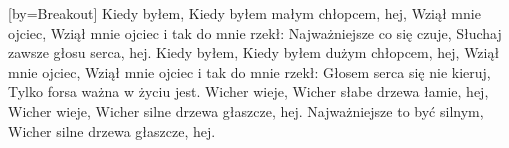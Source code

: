 [by={Breakout}]
  \beginverse
    Kiedy byłem,
    Kiedy byłem małym chłopcem, hej,
    Wziął mnie ojciec,
    Wziął mnie ojciec i tak do mnie rzekł:
    Najważniejsze co się czuje,
    Słuchaj zawsze głosu serca, hej.
  \endverse
  \beginverse
    Kiedy byłem,
    Kiedy byłem dużym chłopcem, hej,
    Wziął mnie ojciec,
    Wziął mnie ojciec i tak do mnie rzekł:
    Głosem serca się nie kieruj,
    Tylko forsa ważna w życiu jest.
  \endverse
  \beginverse
    Wicher wieje,
    Wicher słabe drzewa łamie, hej,
    Wicher wieje,
    Wicher silne drzewa głaszcze, hej.
    Najważniejsze to być silnym,
    Wicher silne drzewa głaszcze, hej.
  \endverse
\endsong
